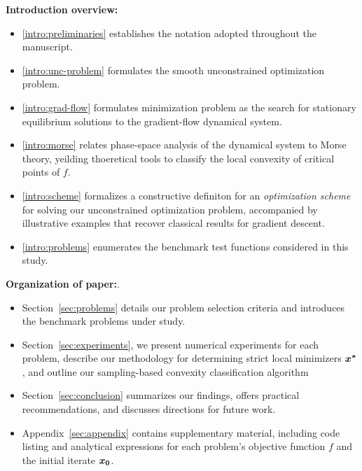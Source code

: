 \documentclass[10pt]{article}
\begin{document}
    \textbf{Introduction overview:} 
    \begin{itemize}
        \item \ref{intro:preliminaries} establishes the notation adopted throughout the manuscript.\
        \item \ref{intro:unc-problem} formulates the smooth unconstrained optimization problem.\
        \item \ref{intro:grad-flow} formulates minimization problem as the search for stationary
        equilibrium solutions to the gradient-flow dynamical system.\
        \item \ref{intro:morse} relates phase-space analysis of the dynamical system to Morse theory,
        yeilding thoeretical tools to classify the local convexity of critical points of $f$.\
        \item \ref{intro:scheme} formalizes a constructive definiton for an \emph{optimization scheme} 
        for solving our unconstrained optimization problem, accompanied 
        by illustrative examples that recover classical results for gradient descent.\
        \item \ref{intro:problems} enumerates the benchmark test functions considered in this study.\
    \end{itemize}

    \textbf{Organization of paper:}. 
    \begin{itemize}
        \item Section~\ref{sec:problems} details our problem selection criteria and introduces the benchmark problems under study.
        \item Section~\ref{sec:experiments}, we present numerical experiments for each problem, describe our methodology for 
        determining strict local minimizers $\bm{x^*}$, and outline our sampling-based convexity classification algorithm
        \item Section~\ref{sec:conclusion} summarizes our findings, offers practical recommendations, and discusses directions for future work.
        \item Appendix~\ref{sec:appendix} contains supplementary material, including code listing and analytical expressions for each problem's objective function $f$ and 
        the initial iterate $\bm{x_0}$.
    \end{itemize}

    \bigskip

\end{document}
